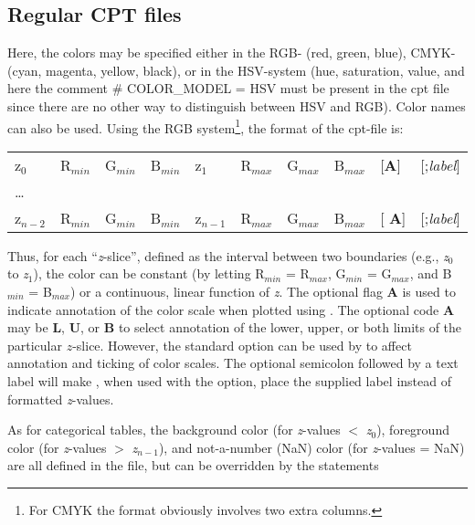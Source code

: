 \subsection{Regular CPT files}

Here, the colors may be specified either in the RGB- (red, green, blue), CMYK- (cyan,
magenta, yellow, black), or in the HSV-system (hue, saturation, value, and
here the comment \# COLOR\_MODEL = HSV must be present in the cpt file since there
are no other way to distinguish between HSV and RGB).  Color names can also be used.
Using the RGB system\footnote{For CMYK the format obviously involves two extra columns.},
the format of the cpt-file is: 

\begin{center}
\begin{tabular}{llllllllll}
z$_0$ &  R$_{min}$ &  G$_{min}$ &  B$_{min}$ &  z$_1$ & R$_{max}$ &  G$_{max}$ &  B$_{max}$ &  [\textbf{A}] &
[;\emph{label}] \\ 
\ldots & & & & & & & & & \\ 
z$_{n-2}$ &  R$_{min}$ &  G$_{min}$ &  B$_{min}$ &  z$_{n-1}$ &  R$_{max}$ &  G$_{max}$ &  B$_{max}$ &  [{\bf
A}] & [;\emph{label}]\\
\end{tabular} 
\end{center}

Thus, for each ``\emph{z}-slice'', defined as the interval between two boundaries
(e.g., \emph{z$_0$} to \emph{z$_1$}), the color can be constant (by letting R$_{min}$
= R$_{max}$, G$_{min}$ = G$_{max}$, and B$_{min}$ = B$_{max}$) or a continuous,
linear function of \emph{z}.  The optional flag \textbf{A} is used to indicate annotation
of the color scale when plotted using .  The optional code \textbf{A} may be \textbf{L},
\textbf{U}, or \textbf{B} to select annotation of the lower, upper, or both limits
of the particular $z$-slice.  However, the standard  option can be used
by  to affect annotation and ticking of color scales.  The optional
semicolon followed by a text label will make , when used with the  option,
place the supplied label instead of formatted \emph{z}-values.

As for categorical tables, the background color (for \emph{z}-values $<$ \emph{z$_0$}), foreground color
(for \emph{z}-values $>$ \emph{z$_{n-1}$}), and not-a-number (NaN) color (for
\emph{z}-values = NaN) are all defined in the 
file, but can be overridden by the statements

